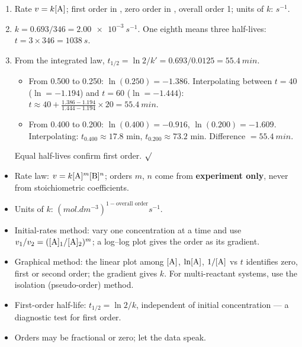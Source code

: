 \documentclass[11pt]{article}
\begin{document}
\begin{corrige}[Exercise 4.4]
\begin{enumerate}
\item Rate $v = k[\ce{A}]$; first order in , zero order in , overall order 1; units of $k$: $\si{s^{-1}}$.
\item $k = 0.693/346 = \SI{2.00e-3}{s^{-1}}$. One eighth means three half-lives: $t = 3 \times 346 = \SI{1038}{s}$.
\item From the integrated law, $t_{1/2} = \ln 2 / k' = 0.693 / 0.0125 = \SI{55.4}{min}$.
  \begin{itemize}
  \item From 0.500 to 0.250: $\ln(0.250) = -1.386$. Interpolating between $t=40$ ($\ln=-1.194$) and $t=60$ ($\ln=-1.444$): $t \approx 40 + \frac{1.386-1.194}{1.444-1.194}\times20 = \SI{55.4}{min}$.
  \item From 0.400 to 0.200: $\ln(0.400)=-0.916$, $\ln(0.200)=-1.609$. Interpolating: $t_{0.400}\approx 17.8$ min, $t_{0.200}\approx 73.2$ min. Difference $= \SI{55.4}{min}$.
  \end{itemize}
  Equal half-lives confirm first order. $\surd$
\end{enumerate}
\end{corrige}

\begin{aretenir}
\begin{itemize}
\item Rate law: $v = k[\ce{A}]^m[\ce{B}]^n$; orders $m$, $n$ come from \textbf{experiment only}, never from stoichiometric coefficients.
\item Units of $k$: $(\si{mol.dm^{-3}})^{1-\text{overall order}}\si{s^{-1}}$.
\item Initial-rates method: vary one concentration at a time and use $v_1/v_2 = ([\ce{A}]_1/[\ce{A}]_2)^m$; a log--log plot gives the order as its gradient.
\item Graphical method: the linear plot among $[\ce{A}]$, $\ln[\ce{A}]$, $1/[\ce{A}]$ vs $t$ identifies zero, first or second order; the gradient gives $k$. For multi-reactant systems, use the isolation (pseudo-order) method.
\item First-order half-life: $t_{1/2} = \ln 2 / k$, independent of initial concentration --- a diagnostic test for first order.
\item Orders may be fractional or zero; let the data speak.
\end{itemize}
\end{aretenir}
\end{document}
